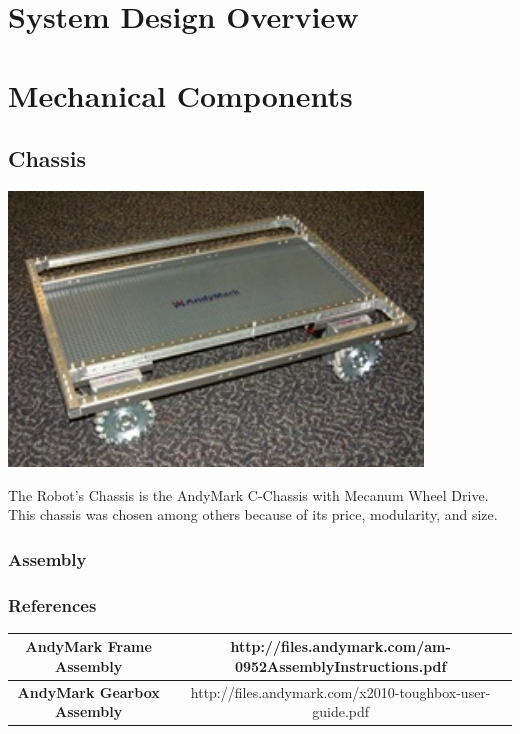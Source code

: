 \documentclass[letterpaper,12pt]{article}
\begin{document}
\section{System Design Overview}

\section{Mechanical Components}
\subsection{Chassis}
\begin{center}
    \includegraphics[width=11cm]{pics/chassis/andymark_chassis.jpg}
\end{center}

The Robot's Chassis is the AndyMark C-Chassis with Mecanum Wheel Drive. This
chassis was chosen among others because of its price, modularity, and size.

\subsubsection{Assembly}
\subsubsection{References}

\begin{table}[h!]
  \begin{tabular}{| c | c |}
    \hline
    \textbf{AndyMark Frame Assembly} &  http://files.andymark.com/am-0952AssemblyInstructions.pdf\\
    \hline
    \textbf{AndyMark Gearbox Assembly} &  http://files.andymark.com/x2010-toughbox-user-guide.pdf\\
    \hline
  \end{tabular}
  \label{tab:fire_cmd_msg}
\end{table}
\end{document}
